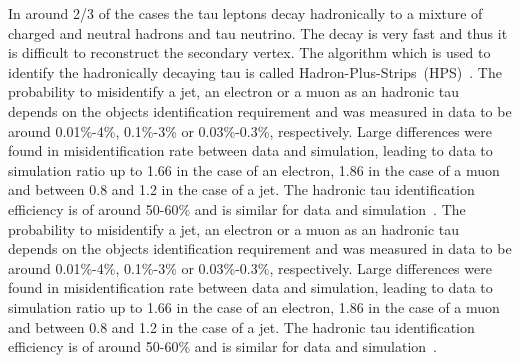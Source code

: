 In around 2/3 of the cases the tau leptons decay hadronically to a mixture of charged and neutral hadrons and tau neutrino. The decay is very fast and thus it is difficult to reconstruct the secondary vertex. The algorithm which is used to identify the hadronically decaying tau is called Hadron-Plus-Strips~(HPS)~\cite{CMS:2016gvn}. The probability to misidentify a jet, an electron or a muon as an hadronic tau  depends on the objects identification requirement and was measured in data to be around 0.01\%-4\%, 0.1\%-3\% or 0.03\%-0.3\%, respectively. Large differences were found in misidentification rate between data and simulation, leading to data to simulation ratio up to 1.66 in the case of an electron, 1.86 in the case of a muon and between 0.8 and 1.2 in the case of a jet. The hadronic tau identification efficiency is of around 50-60\% and is similar for data and simulation~\cite{Khachatryan:2015dfa}. The probability to misidentify a jet, an electron or a muon as an hadronic tau  depends on the objects identification requirement and was measured in data to be around 0.01\%-4\%, 0.1\%-3\% or 0.03\%-0.3\%, respectively. Large differences were found in misidentification rate between data and simulation, leading to data to simulation ratio up to 1.66 in the case of an electron, 1.86 in the case of a muon and between 0.8 and 1.2 in the case of a jet. The hadronic tau identification efficiency is of around 50-60\% and is similar for data and simulation~\cite{Khachatryan:2015dfa}.



